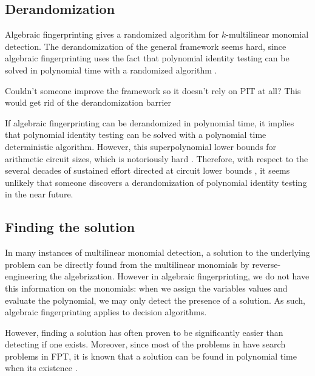 \subsection{Derandomization}
\label{sect:derandomization}

Algebraic fingerprinting gives a randomized algorithm for $k$-multilinear monomial detection. 
The derandomization of the general framework seems hard, since algebraic fingerprinting 
uses the fact that polynomial identity testing can be solved in polynomial time with 
a randomized algorithm \cite{Williams09}.

\begin{anamnote}[nomargin]{}
  Couldn't someone improve the framework so it doesn't rely on PIT at all?
  This would get rid of the derandomization barrier
\end{anamnote}

If algebraic fingerprinting can be derandomized 
in polynomial time, it implies that polynomial identity testing can be solved with a 
polynomial time deterministic algorithm. However, this
 superpolynomial 
lower bounds for arithmetic circuit sizes, which is notoriously hard \cite{Kabanets03}. 
Therefore, with respect to the several decades of 
sustained effort directed at circuit lower bounds \cite{Kabanets03}, 
it seems unlikely that someone discovers a derandomization of polynomial identity testing 
in the near future.

\subsection{Finding the solution}
\label{sect:finding_the_solution}

In many instances of multilinear monomial detection, 
a solution to the underlying problem can be directly found 
from the multilinear monomials by 
reverse-engineering the algebrization. 
However in algebraic fingerprinting, we do not have this information on the monomials: 
when we assign the variables values and evaluate the polynomial, we may only detect the 
presence of a solution. As such, algebraic fingerprinting applies to decision algorithms.

However, finding a solution 
has often proven to be significantly easier than detecting if one exists. 
Moreover, since most of the problems in  
have search problems in FPT, it is known that a solution can be found in polynomial time when its 
existence 
.

